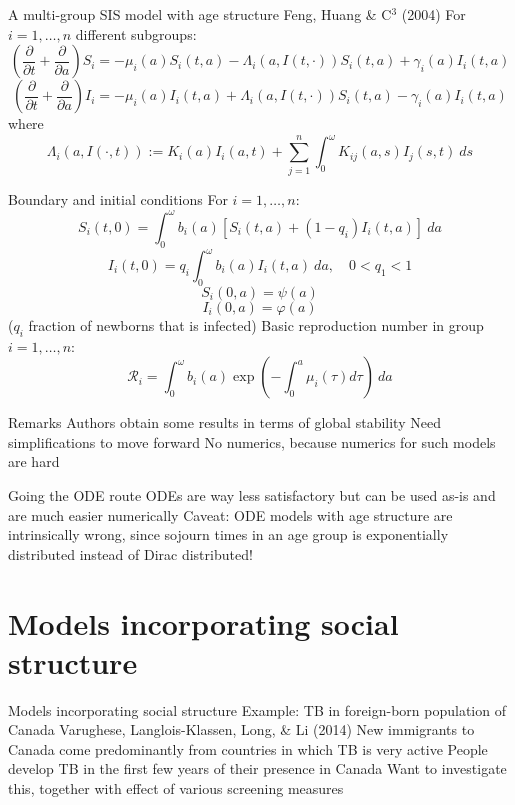 \documentclass[aspectratio=169]{beamer}\usepackage[]{graphicx}\usepackage[]{xcolor}
\begin{document}
\begin{frame}{A multi-group SIS model with age structure}
\bbullet Feng, Huang \& C$^3$ (2004)
\bbullet For $i=1,\ldots,n$ different subgroups:
\[
\left(
\frac{\partial}{\partial t}+\frac{\partial}{\partial a}
\right)S_i = -\mu_i(a)S_i(t,a)-\Lambda_i(a,I(t,\cdot))S_i(t,a)+\gamma_i(a)I_i(t,a)
\]
\[
\left(
\frac{\partial}{\partial t}+\frac{\partial}{\partial a}
\right)I_i = -\mu_i(a)I_i(t,a)+\Lambda_i(a,I(t,\cdot))S_i(t,a)-\gamma_i(a)I_i(t,a)
\]
where
\[
\Lambda_i(a,I(\cdot,t)):=K_i(a)I_i(a,t)+\sum_{j=1}^n \int_0^\omega K_{ij}(a,s)I_j(s,t)\ ds
\]
\end{frame}

\begin{frame}{Boundary and initial conditions}
For $i=1,\ldots,n$:
\[
S_i(t,0) = \int_0^\omega b_i(a)[S_i(t,a)+(1-q_i)I_i(t,a)]\ da
\]
\[
I_i(t,0) = q_i\int_0^\omega b_i(a)I_i(t,a)\ da,\quad 0<q_1<1
\]
\[
S_i(0,a) = \psi(a)
\]
\[
I_i(0,a) = \varphi(a)
\]
($q_i$ fraction of newborns that is infected)
\vfill
Basic reproduction number in group $i=1,\ldots,n$:
\[
\mathcal{R}_i = \int_0^\omega b_i(a)\exp\left(-\int_0^a \mu_i(\tau)d\tau\right)\ da
\]
\end{frame}

\begin{frame}{Remarks}
\bbullet Authors obtain some results in terms of global stability
\bbullet Need simplifications to move forward
\bbullet No numerics, because numerics for such models are hard
\end{frame}

\begin{frame}{Going the ODE route}
\bbullet ODEs are way less satisfactory but can be used as-is and are much easier numerically
\bbullet Caveat: ODE models with age structure are intrinsically wrong, since sojourn times in an age group is exponentially distributed instead of Dirac distributed!
\end{frame}

\section{Models incorporating social structure}
\begin{frame}{Models incorporating social structure}
\bbullet Example: TB in foreign-born population of Canada
\bbullet Varughese, Langlois-Klassen, Long, \& Li (2014)
\bbullet New immigrants to Canada come predominantly from countries in which TB is very active
\bbullet People develop TB in the first few years of their presence in Canada
\bbullet Want to investigate this, together with effect of various screening measures
\end{frame}
\end{document}
